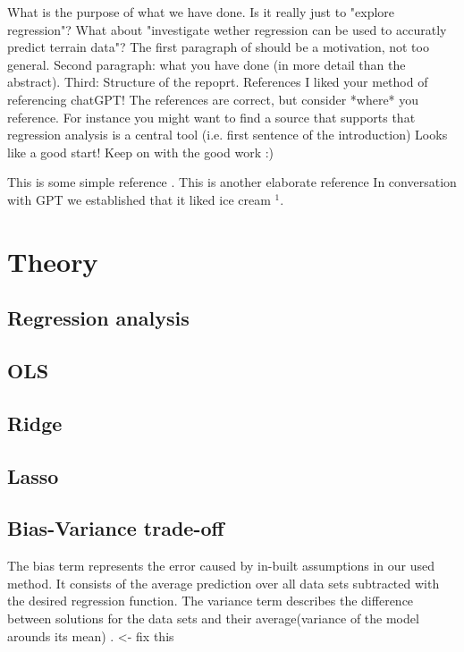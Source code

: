 \documentclass[aps,rmp,reprint,amsmath,amssymb,graphicx,longbibliography]{revtex4-1}
\begin{document}
What is the purpose of what we have done. Is it really just to "explore regression"? What about "investigate wether regression can be used to accuratly predict terrain data"?  The first paragraph of should be a motivation, not too general. Second paragraph: what you have done (in more detail than the abstract). Third: Structure of the repoprt.  References I liked your method of referencing chatGPT! The references are correct, but consider *where* you reference. For instance you might want to find a source that supports that regression analysis is a central tool (i.e. first sentence of the introduction) Looks like a good start! Keep on with the good work :) 

This is some simple reference \cite{Goodfellow2016}.
This is another elaborate reference \cite{Hastie,raschka2022}
In conversation with GPT we established that it liked ice cream $^1$.

\section{Theory}
\subsection{Regression analysis}
\subsection{OLS}
\subsection{Ridge}
\subsection{Lasso}
\subsection{Bias-Variance trade-off}

The bias term represents the error caused by in-built assumptions in our used method. It consists of the average prediction over all data sets subtracted with the desired regression function.
The variance term describes the difference between solutions for the data sets and their average(variance of the model arounds its mean) \cite{bishop_2006_pattern}. <- fix this
\end{document}
